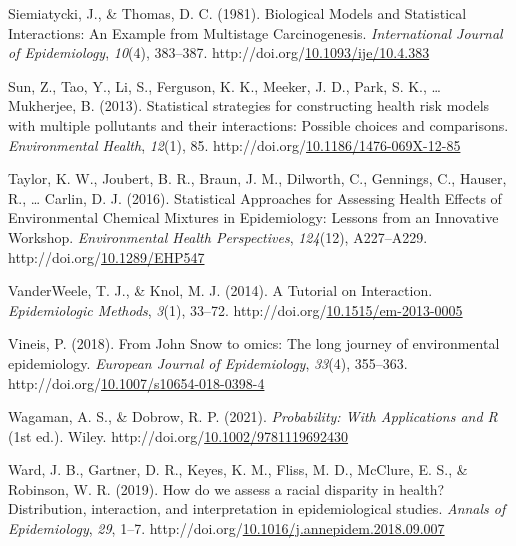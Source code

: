 \documentclass[12pt, twoside]{amherstthesis}
\newenvironment{CSLReferences}[2]%
  {}%
  {\par}
\begin{document}
\begin{CSLReferences}{1}{0}
\leavevmode{}%
Siemiatycki, J., \& Thomas, D. C. (1981). Biological {Models} and {Statistical} {Interactions}: An {Example} from {Multistage} {Carcinogenesis}. \emph{International Journal of Epidemiology}, \emph{10}(4), 383--387. http://doi.org/\href{https://doi.org/10.1093/ije/10.4.383}{10.1093/ije/10.4.383}

\leavevmode{}%
Sun, Z., Tao, Y., Li, S., Ferguson, K. K., Meeker, J. D., Park, S. K., \ldots{} Mukherjee, B. (2013). Statistical strategies for constructing health risk models with multiple pollutants and their interactions: Possible choices and comparisons. \emph{Environmental Health}, \emph{12}(1), 85. http://doi.org/\href{https://doi.org/10.1186/1476-069X-12-85}{10.1186/1476-069X-12-85}

\leavevmode{}%
Taylor, K. W., Joubert, B. R., Braun, J. M., Dilworth, C., Gennings, C., Hauser, R., \ldots{} Carlin, D. J. (2016). Statistical {Approaches} for {Assessing} {Health} {Effects} of {Environmental} {Chemical} {Mixtures} in {Epidemiology}: {Lessons} from an {Innovative} {Workshop}. \emph{Environmental Health Perspectives}, \emph{124}(12), A227--A229. http://doi.org/\href{https://doi.org/10.1289/EHP547}{10.1289/EHP547}

\leavevmode{}%
VanderWeele, T. J., \& Knol, M. J. (2014). A {Tutorial} on {Interaction}. \emph{Epidemiologic Methods}, \emph{3}(1), 33--72. http://doi.org/\href{https://doi.org/10.1515/em-2013-0005}{10.1515/em-2013-0005}

\leavevmode{}%
Vineis, P. (2018). From {John} {Snow} to omics: The long journey of environmental epidemiology. \emph{European Journal of Epidemiology}, \emph{33}(4), 355--363. http://doi.org/\href{https://doi.org/10.1007/s10654-018-0398-4}{10.1007/s10654-018-0398-4}

\leavevmode{}%
Wagaman, A. S., \& Dobrow, R. P. (2021). \emph{Probability: {With} {Applications} and {R}} (1st ed.). Wiley. http://doi.org/\href{https://doi.org/10.1002/9781119692430}{10.1002/9781119692430}

\leavevmode{}%
Ward, J. B., Gartner, D. R., Keyes, K. M., Fliss, M. D., McClure, E. S., \& Robinson, W. R. (2019). How do we assess a racial disparity in health? {Distribution}, interaction, and interpretation in epidemiological studies. \emph{Annals of Epidemiology}, \emph{29}, 1--7. http://doi.org/\href{https://doi.org/10.1016/j.annepidem.2018.09.007}{10.1016/j.annepidem.2018.09.007}


\end{CSLReferences}
\end{document}

